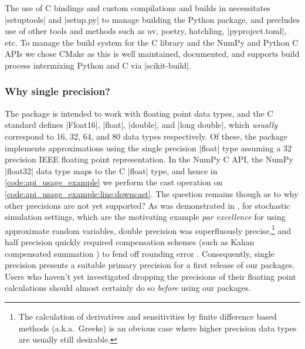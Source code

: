 The use of C bindings and custom compilations and builds in \pyarv necessitates \inlineplain|setuptools| and \inlineplain|setup.py| to manage building the Python package, and precludes use of other tools and methods such as uv, poetry, hatchling, \inlineplain|pyproject.toml|, etc. To manage the build system for the \arv C library and the NumPy and Python C APIs we chose CMake as this is well maintained, documented, and supports build process intermixing Python and C via \inlineplain|scikit-build|. 

\subsubsection{Why single precision?}

The package is intended to work with floating point data types, and the C standard defines \inlineplain|Float16|, \inlineplain|float|, \inlineplain|double|, and \inlineplain|long double|, which \textit{usually} correspond to 16, 32, 64, and \qty{80}{\bit} data types respectively.   Of these, the \arv package implements approximations using the single precision \inlineplain|float| type assuming a \qty{32}{\bit} precision IEEE floating point representation.
 In the NumPy C API, the NumPy \inlineplain|float32| data type maps to the C \inlineplain|float| type, and hence in \cref{code:api_usage_example} we perform the cast operation on \cref{code:api_usage_example:line:downcast}. The question remains though as to why other precisions are not yet supported? As was demonstrated in \citep{giles2024rounding}, for stochastic simulation settings, which are the motivating example \textit{par excellence} for using approximate random variables, double precision was superfluously precise,\footnote{The calculation of derivatives and sensitivities by finite difference based methods (a.k.a.\ Greeks) is an obvious case where higher precision data types are usually still desirable.} and half precision quickly required compensation schemes (such as Kahan compensated summation \citep{todo}) to fend off rounding error \citep[fig.\,3.1]{giles2024rounding}. Consequently, single precision presents a suitable primary precision for a first release of our packages. Users who haven't yet investigated dropping the precisions of their floating point calculations should almost certainly do so \textit{before} using our packages. 


